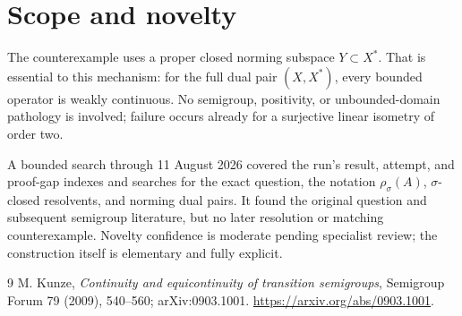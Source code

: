 \documentclass[11pt]{article}
\begin{document}
\section{Scope and novelty}

The counterexample uses a proper closed norming subspace $Y\subset X^*$.
That is essential to this mechanism: for the full dual pair $(X,X^*)$, every
bounded operator is weakly continuous.  No semigroup, positivity, or
unbounded-domain pathology is involved; failure occurs already for a
surjective linear isometry of order two.

A bounded search through 11 August 2026 covered the run's result, attempt,
and proof-gap indexes and searches for the exact question, the notation
$\rho_\sigma(A)$, $\sigma$-closed resolvents, and norming dual pairs.  It found
the original question and subsequent semigroup literature, but no later
resolution or matching counterexample.  Novelty confidence is moderate
pending specialist review; the construction itself is elementary and fully
explicit.

\begin{thebibliography}{9}
M. Kunze,
\emph{Continuity and equicontinuity of transition semigroups},
Semigroup Forum 79 (2009), 540--560; arXiv:0903.1001.
\url{https://arxiv.org/abs/0903.1001}.
\end{thebibliography}
\end{document}
